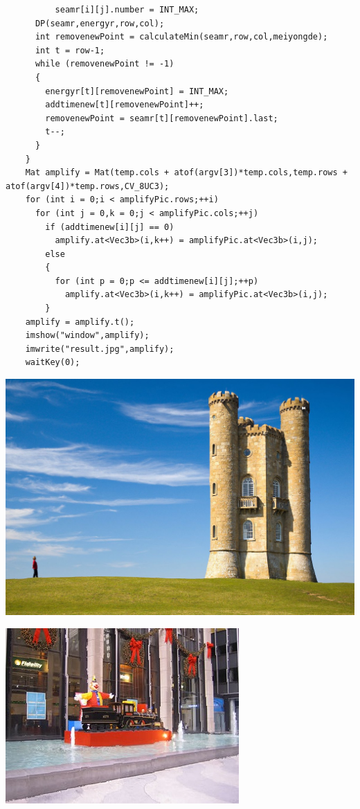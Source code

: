 \documentclass[10pt, a4paper]{article}
\begin{document}
\begin{lstlisting}
          seamr[i][j].number = INT_MAX;
      DP(seamr,energyr,row,col);
      int removenewPoint = calculateMin(seamr,row,col,meiyongde);
      int t = row-1;
      while (removenewPoint != -1)
      {
        energyr[t][removenewPoint] = INT_MAX;
        addtimenew[t][removenewPoint]++;
        removenewPoint = seamr[t][removenewPoint].last;
        t--;
      }
    }
    Mat amplify = Mat(temp.cols + atof(argv[3])*temp.cols,temp.rows + atof(argv[4])*temp.rows,CV_8UC3);
    for (int i = 0;i < amplifyPic.rows;++i)
      for (int j = 0,k = 0;j < amplifyPic.cols;++j)
        if (addtimenew[i][j] == 0)
          amplify.at<Vec3b>(i,k++) = amplifyPic.at<Vec3b>(i,j);
        else
        {
          for (int p = 0;p <= addtimenew[i][j];++p)
            amplify.at<Vec3b>(i,k++) = amplifyPic.at<Vec3b>(i,j);
        }
    amplify = amplify.t();
    imshow("window",amplify);
    imwrite("result.jpg",amplify);
    waitKey(0);
    \end{lstlisting}

    
    \includegraphics[scale = .3]{1Amplify.jpg}

    \includegraphics[scale = .3]{3Amplify.jpg}
\end{document}
